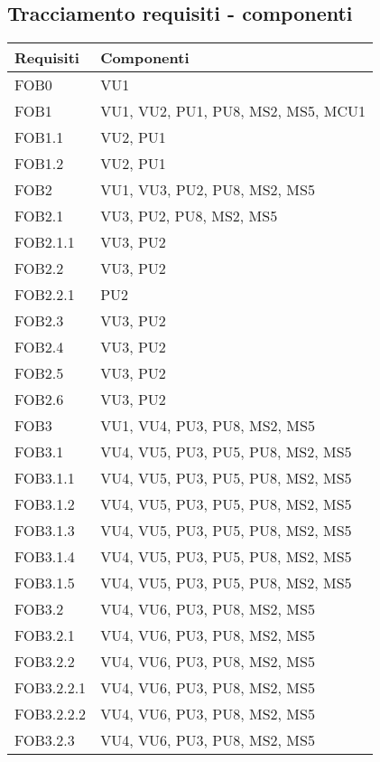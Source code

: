 {\subsection{Tracciamento requisiti - componenti}{
\begin{longtable}{p{} p{}}
\toprule
\textbf{Requisiti}	&	\textbf{Componenti}\\
\midrule
\midrule
FOB0		& 	{VU1}\\
\midrule
FOB1		& 	{VU1, VU2, PU1, PU8, MS2, MS5, MCU1}\\
\midrule
FOB1.1		& 	{VU2, PU1}\\
\midrule
FOB1.2		& 	{VU2, PU1}\\
\midrule
FOB2	& 	{VU1, VU3, PU2, PU8, MS2, MS5}\\
\midrule
FOB2.1		& 	{VU3, PU2, PU8, MS2, MS5}\\
\midrule
FOB2.1.1		& 	{VU3, PU2}\\
\midrule
FOB2.2		& 	{VU3, PU2}\\
\midrule
FOB2.2.1		& 	{PU2}\\
\midrule
FOB2.3		& 	{VU3, PU2}\\
\midrule
FOB2.4		& 	{VU3, PU2}\\
\midrule
FOB2.5		& 	{VU3, PU2}\\
\midrule
FOB2.6		& 	{VU3, PU2}\\
\midrule
FOB3		& 	{VU1, VU4, PU3, PU8, MS2, MS5}\\
\midrule
FOB3.1	& 	{VU4, VU5, PU3, PU5, PU8, MS2, MS5}\\
\midrule
FOB3.1.1		& 	{VU4, VU5, PU3, PU5, PU8, MS2, MS5}\\
\midrule
FOB3.1.2		& 	{VU4, VU5, PU3, PU5, PU8, MS2, MS5}\\
\midrule
FOB3.1.3		& 	{VU4, VU5, PU3, PU5, PU8, MS2, MS5}\\
\midrule
FOB3.1.4		& 	{VU4, VU5, PU3, PU5, PU8, MS2, MS5}\\
\midrule
FOB3.1.5		& 	{VU4, VU5, PU3, PU5, PU8, MS2, MS5}\\
\midrule
FOB3.2		& 	{VU4, VU6, PU3, PU8, MS2, MS5}\\
\midrule
FOB3.2.1		& 	{VU4, VU6, PU3, PU8, MS2, MS5}\\
\midrule
FOB3.2.2		& 	{VU4, VU6, PU3, PU8, MS2, MS5}\\
\midrule
FOB3.2.2.1		& 	{VU4, VU6, PU3, PU8, MS2, MS5}\\
\midrule
FOB3.2.2.2		& 	{VU4, VU6, PU3, PU8, MS2, MS5}\\
\midrule
FOB3.2.3		& 	{VU4, VU6, PU3, PU8, MS2, MS5}\\

\end{longtable}}}
